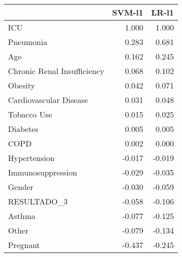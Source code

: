 \begin{tabular}{lrr}
\toprule
{} &  SVM-l1 &  LR-l1 \\
\midrule
ICU                         &   1.000 &  1.000 \\
Pneumonia                   &   0.283 &  0.681 \\
Age                         &   0.162 &  0.245 \\
Chronic Renal Insufficiency &   0.068 &  0.102 \\
Obesity                     &   0.042 &  0.071 \\
Cardiovascular Disease      &   0.031 &  0.048 \\
Tobacco Use                 &   0.015 &  0.025 \\
Diabetes                    &   0.005 &  0.005 \\
COPD                        &   0.002 &  0.000 \\
Hypertension                &  -0.017 & -0.019 \\
Immunosuppression           &  -0.029 & -0.035 \\
Gender                      &  -0.030 & -0.059 \\
RESULTADO\_3                 &  -0.058 & -0.106 \\
Asthma                      &  -0.077 & -0.125 \\
Other                       &  -0.079 & -0.134 \\
Pregnant                    &  -0.437 & -0.245 \\
\bottomrule
\end{tabular}
